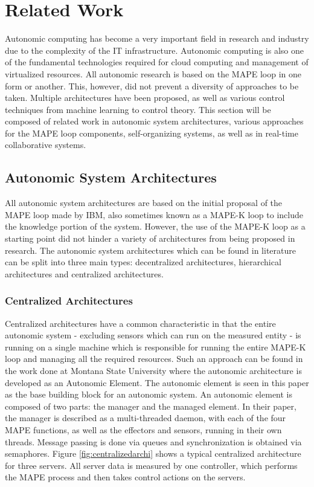 \section{Related Work}

Autonomic computing has become a very important field in research and industry due to the complexity of the IT infrastructure. Autonomic computing is also one of the fundamental technologies required for cloud computing and management of virtualized resources. All autonomic research is based on the MAPE loop in one form or another. This, however, did not prevent a diversity of approaches to be taken. Multiple architectures have been proposed, as well as various control techniques from machine learning to control theory. This section will be composed of related work in autonomic system architectures, various approaches for the MAPE loop components, self-organizing systems, as well as in real-time collaborative systems.

\subsection{Autonomic System Architectures}

All autonomic system architectures are based on the initial proposal of the MAPE loop made by IBM, also sometimes known as a MAPE-K loop to include the knowledge portion of the system. However, the use of the MAPE-K loop as a starting point did not hinder a variety of architectures from being proposed in research. The autonomic system architectures which can be found in literature can be split into three main types: decentralized architectures, hierarchical architectures and centralized architectures.

\subsubsection{Centralized Architectures}

Centralized architectures have a common characteristic in that the entire autonomic system - excluding sensors which can run on the measured entity - is running on a single machine which is responsible for running the entire MAPE-K loop and managing all the required resources. Such an approach can be found in the work done at Montana State University \cite{related:architecture:autonomicelement} where the autonomic architecture is developed as an Autonomic Element. The autonomic element is seen in this paper as the base building block for an autonomic system. An autonomic element is composed of two parts: the manager and the managed element. In their paper, the manager is described as a multi-threaded daemon, with each of the four MAPE functions, as well as the effectors and sensors, running in their own threads. Message passing is done via queues and synchronization is obtained via semaphores. Figure \ref{fig:centralizedarchi} shows a typical centralized architecture for three servers. All server data is measured by one controller, which performs the MAPE process and then takes control actions on the servers.

